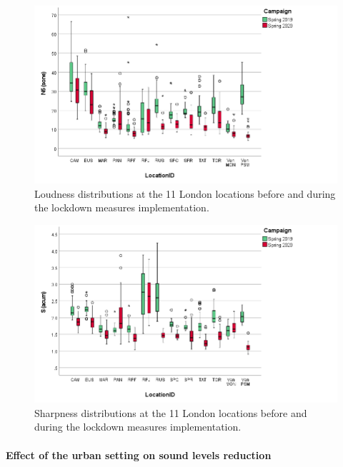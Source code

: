 \begin{figure}[h]
  \centering
  \includegraphics[width=.75\textwidth]{Figures/LockdownLoudness.png}
  \caption{Loudness distributions at the 11 London locations before and during the lockdown measures implementation. \label{fig:NsMapLockN5}}
\end{figure}


\begin{figure}[h]
  \centering
  \includegraphics[width=.75\textwidth]{Figures/LockdownSharp.png}
  \caption{Sharpness distributions at the 11 London locations before and during the lockdown measures implementation. \label{fig:NsMapLockS}}
\end{figure}

\paragraph*{Effect of the urban setting on sound levels reduction}

